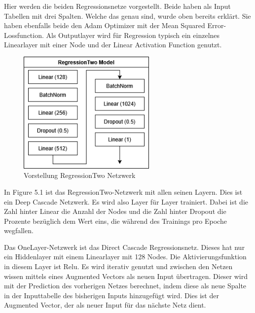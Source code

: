 Hier werden die beiden Regressionsnetze vorgestellt. Beide haben als Input Tabellen mit drei Spalten. 
Welche das genau sind, wurde oben bereits erklärt. Sie haben ebenfalls beide den Adam Optimizer mit der Mean Squared Error-Lossfunction. 
Als Outputlayer wird für Regression typisch ein einzelnes Linearlayer mit einer Node und der Linear Activation Function genutzt. 

\begin{figure}[htpb]
    \includegraphics[height=6cm]{../../Graphiken/regressiontwo_2.png}
    \caption{\label{fig:regr2} Vorstellung RegressionTwo Netzwerk}
\end{figure}

In Figure 5.1 ist das RegressionTwo-Netzwerk mit allen seinen Layern. Dies ist ein Deep Cascade Netzwerk. Es wird also Layer für Layer trainiert. 
Dabei ist die Zahl hinter Linear die Anzahl der Nodes und die Zahl hinter 
Dropout die Prozente bezüglich dem Wert eins, die während des Trainings pro Epoche wegfallen. 

Das OneLayer-Netzwerk ist das Direct Cascade Regressionsnetz. Dieses hat nur ein Hiddenlayer mit einem Linearlayer mit 128 Nodes. Die 
Aktivierungsfunktion in diesem Layer ist Relu. Es wird iterativ genutzt und zwischen den Netzen wissen mittels eines Augmented Vectors als 
neuen Input übertragen. 
Dieser wird mit der Prediction des vorherigen Netzes berechnet, indem diese als neue Spalte in der Inputtabelle des bisherigen Inputs hinzugefügt 
wird. Dies ist der Augmented Vector, der als neuer Input für das nächste Netz dient. 
